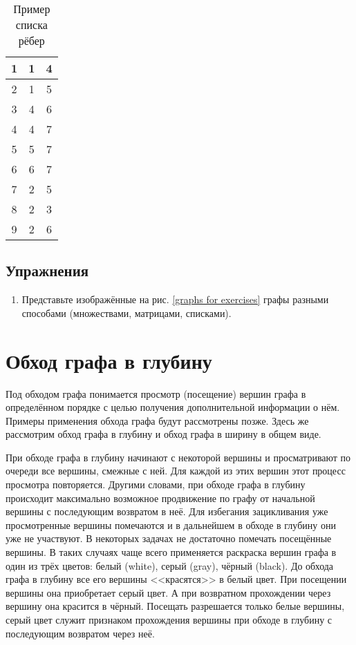 \begin{table}[h]
	\center
	\begin{tabular}{|c|cc|}
		\hline
		1 & 1 & 4\\
		\hline
		2 & 1 & 5\\
		\hline
		3 & 4 & 6\\
		\hline
		4 & 4 & 7\\
		\hline
		5 & 5 & 7\\
		\hline
		6 & 6 & 7\\
		\hline
		7 & 2 & 5\\
		\hline
		8 & 2 & 3\\
		\hline
		9 & 2 & 6\\
		\hline
	\end{tabular}
	\caption{Пример списка рёбер}
\end{table}

\subsection{Упражнения}

\begin{enumerate}
	\item Представьте изображённые на рис. \ref{graphs for exercises} графы разными способами (множествами, матрицами, списками).
\end{enumerate}

\section{Обход графа в глубину}

Под обходом графа понимается просмотр (посещение) вершин графа в определённом 
порядке с целью получения дополнительной информации о нём. Примеры применения 
обхода графа будут рассмотрены позже. Здесь же рассмотрим обход графа в глубину 
и обход графа в ширину в общем виде.

При обходе графа в глубину начинают с некоторой вершины и просматривают по 
очереди все вершины, смежные с ней. Для каждой из этих вершин этот процесс 
просмотра повторяется. Другими словами, при обходе графа в глубину происходит 
максимально возможное продвижение по графу от начальной вершины с последующим 
возвратом в неё. Для избегания зацикливания уже просмотренные вершины 
помечаются и в дальнейшем в обходе в глубину они уже не участвуют. В некоторых 
задачах не достаточно помечать посещённые вершины. В таких случаях чаще всего 
применяется раскраска вершин графа в один из трёх цветов: белый (white), серый 
(gray), чёрный (black). До обхода графа в глубину все его вершины <<красятся>> 
в белый цвет. При посещении вершины она приобретает серый цвет. А при 
возвратном прохождении через вершину она красится в чёрный. Посещать 
разрешается только белые вершины, серый цвет служит признаком прохождения 
вершины при обходе в глубину с последующим возвратом через неё.

